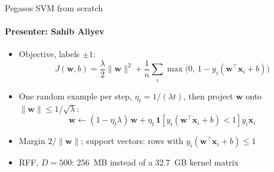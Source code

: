 \documentclass[14pt,aspectratio=169]{beamer}
\newcommand{\presenter}[1]{\framesubtitle{Presenter: #1}}
\newcommand{\gap}{\setlength{\itemsep}{0.45em}}
\begin{document}
\begin{frame}{Pegasos SVM from scratch}
  \presenter{Sahib Aliyev}
  \begin{itemize}\gap
    \item Objective, labels $\pm 1$: %
      \[J(\mathbf{w},b)=\frac{\lambda}{2}\lVert\mathbf{w}\rVert^{2}
        +\frac{1}{n}\textstyle\sum_i\max\!\big(0,\,1-y_i(\mathbf{w}^{\top}\mathbf{x}_i+b)\big)\]
    \item One random example per step, $\eta_t = 1/(\lambda t)$, then %
      project $\mathbf{w}$ onto $\lVert\mathbf{w}\rVert \le 1/\sqrt{\lambda}$: %
      \[\mathbf{w} \leftarrow (1 - \eta_t\lambda)\,\mathbf{w}
        + \eta_t\,\mathbf{1}\!\left[y_i(\mathbf{w}^\top\mathbf{x}_i + b) < 1\right] y_i\mathbf{x}_i\]
    \item Margin $2/\lVert\mathbf{w}\rVert$; support vectors: rows with
      $y_i(\mathbf{w}^\top\mathbf{x}_i + b) \le 1$ %
    \item RFF, $D = 500$: %
      256~MB instead of a 32.7~GB kernel matrix %
  \end{itemize}
\end{frame}
\end{document}
